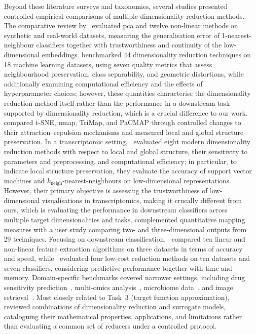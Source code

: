 Beyond these literature surveys and taxonomies, several studies presented controlled empirical comparisons of multiple dimensionality reduction methods.
The comparative review by~\citet{VanEtAl09} evaluated \gls{pca} and twelve non-linear methods on synthetic and real-world datasets, measuring the generalisation error of 1-nearest-neighbour classifiers together with trustworthiness and continuity of the low-dimensional embeddings.
\citet{EspEtAl21} benchmarked 44 dimensionality reduction techniques on 18 machine learning datasets, using seven quality metrics that assess neighbourhood preservation, class separability, and geometric distortions, while additionally examining computational efficiency and the effects of hyperparameter choices; however, these quantities characterise the dimensionality reduction method itself rather than the performance in a downstream task supported by dimensionality reduction, which is a crucial difference to our work.
\citet{WanEtAl21} compared t-SNE, \gls{umap}, TriMap, and PaCMAP through controlled changes to their attraction--repulsion mechanisms and measured local and global structure preservation.
In a transcriptomic setting,~\citet{HuaEtAl22b} evaluated eight modern dimensionality reduction methods with respect to local and global structure, their sensitivity to parameters and preprocessing, and computational efficiency; in particular, to indicate local structure preservation, they evaluate the accuracy of support vector machines and $k_{\mathrm{neigh}}$-nearest-neighbours on low-dimensional representations.
However, their primary objective is assessing the trustworthiness of low-dimensional visualisations in transcriptomics, making it crucally different from ours, which is evaluating the performance in downstream classifiers across multiple target dimensionalities and tasks.
\citet{TiaEtAl21} complemented quantitative mapping measures with a user study comparing two- and three-dimensional outputs from 29 techniques. Focusing on downstream classification,~\citet{AnoEtAl21} compared ten linear and non-linear feature extraction algorithms on three datasets in terms of accuracy and speed, while~\citet{SubEtAl24} evaluated four low-cost reduction methods on ten datasets and seven classifiers, considering predictive performance together with time and memory. Domain-specific benchmarks covered narrower settings, including drug sensitivity prediction~\citep{EckEtAl24}, multi-omics analysis~\citep{CanEtAl21}, microbiome data~\citep{ArmEtAl22}, and image retrieval~\citep{ZhuEtAl14}. Most closely related to Task~3 (target function approximation),~\citet{HouBeh22} reviewed combinations of dimensionality reduction and surrogate models, cataloguing their mathematical properties, applications, and limitations rather than evaluating a common set of reducers under a controlled protocol.

